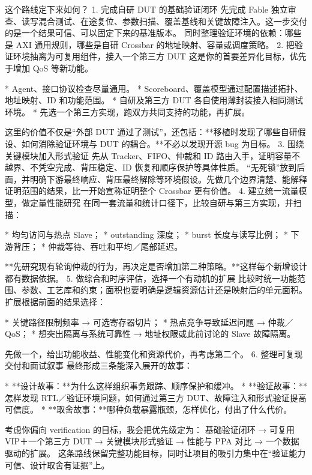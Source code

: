 这个路线定下来如何？
1. 完成自研 DUT 的基础验证闭环
先完成 Fable 独立审查、读写混合测试、在途复位、参数扫描、覆盖基线和关键故障注入。这一步交付的是一个结果可信、可以固定下来的基准版本。
同时整理验证环境的依赖：哪些是 AXI 通用规则，哪些是自研 Crossbar 的地址映射、容量或调度策略。
2. 把验证环境抽离为可复用组件，接入一个第三方 DUT
这是你的首要差异化目标，优先于增加 QoS 等新功能。

* Agent、接口协议检查尽量通用。
* Scoreboard、覆盖模型通过配置描述拓扑、地址映射、ID 和功能范围。
* 自研及第三方 DUT 各自使用薄封装接入相同测试环境。
* 先选一个第三方实现，跑双方共同支持的功能，再扩展。

这里的价值不仅是“外部 DUT 通过了测试”，还包括：**移植时发现了哪些自研假设、如何消除验证环境与 DUT 的耦合。**不必以发现开源 bug 为目标。
3. 围绕关键模块加入形式验证
先从 Tracker、FIFO、仲裁和 ID 路由入手，证明容量不越界、不凭空完成、背压稳定、ID 恢复和顺序保护等具体性质。
“无死锁”放到后面，并明确下游最终响应、背压最终解除等环境假设。先做几个边界清楚、能解释证明范围的结果，比一开始宣称证明整个 Crossbar 更有价值。
4. 建立统一流量模型，做定量性能研究
在同一套流量和统计口径下，比较自研与第三方实现，并扫描：

* 均匀访问与热点 Slave；
* outstanding 深度；
* burst 长度与读写比例；
* 下游背压；
* 仲裁等待、吞吐和平均／尾部延迟。

**先研究现有轮询仲裁的行为，再决定是否增加第二种策略。**这样每个新增设计都有数据依据。
5. 做综合和时序评估，选择一个有动机的扩展
比较时统一功能范围、参数、工艺库和约束；面积也要明确是逻辑资源估计还是映射后的单元面积。
扩展根据前面的结果选择：

* 关键路径限制频率 → 可选寄存器切片；
* 热点竞争导致延迟问题 → 仲裁／QoS；
* 想突出隔离与系统可靠性 → 地址权限或此前讨论的 Slave 故障隔离。

先做一个，给出功能收益、性能变化和资源代价，再考虑第二个。
6. 整理可复现交付和面试叙事
最终形成三条能深入展开的故事：

* **设计故事：**为什么这样组织事务跟踪、顺序保护和缓冲。
* **验证故事：**怎样发现 RTL／验证环境问题，如何通过第三方 DUT、故障注入和形式验证提高可信度。
* **取舍故事：**哪种负载暴露瓶颈，怎样优化，付出了什么代价。

考虑你偏向 verification 的目标，我会把优先级定为：
基础验证闭环 → 可复用 VIP＋一个第三方 DUT → 关键模块形式验证 → 性能与 PPA 对比 → 一个数据驱动的扩展。
这条路线保留完整功能目标，同时让项目的吸引力集中在“验证能力可信、设计取舍有证据”上。
